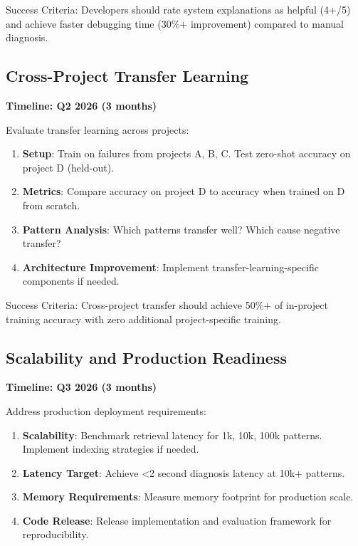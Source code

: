 \documentclass[11pt]{article}
\begin{document}
Success Criteria: Developers should rate system explanations as helpful (4+/5) and achieve faster debugging time (30\%+ improvement) compared to manual diagnosis.

\subsection{Cross-Project Transfer Learning}

\textbf{Timeline: Q2 2026 (3 months)}

Evaluate transfer learning across projects:

\begin{enumerate}
    \item \textbf{Setup}: Train on failures from projects A, B, C. Test zero-shot accuracy on project D (held-out).

    \item \textbf{Metrics}: Compare accuracy on project D to accuracy when trained on D from scratch.

    \item \textbf{Pattern Analysis}: Which patterns transfer well? Which cause negative transfer?

    \item \textbf{Architecture Improvement}: Implement transfer-learning-specific components if needed.
\end{enumerate}

Success Criteria: Cross-project transfer should achieve 50\%+ of in-project training accuracy with zero additional project-specific training.

\subsection{Scalability and Production Readiness}

\textbf{Timeline: Q3 2026 (3 months)}

Address production deployment requirements:

\begin{enumerate}
    \item \textbf{Scalability}: Benchmark retrieval latency for 1k, 10k, 100k patterns. Implement indexing strategies if needed.

    \item \textbf{Latency Target}: Achieve <2 second diagnosis latency at 10k+ patterns.

    \item \textbf{Memory Requirements}: Measure memory footprint for production scale.

    \item \textbf{Code Release}: Release implementation and evaluation framework for reproducibility.
\end{enumerate}
\end{document}
